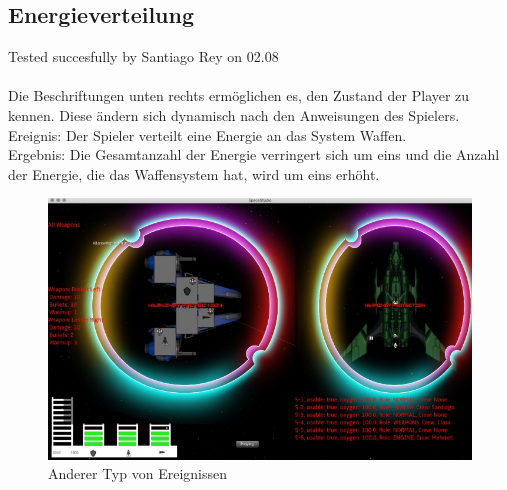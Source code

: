 \documentclass[12pt]{article}
\begin{document}
\subsection{Energieverteilung}
Tested succesfully by Santiago Rey on 02.08\\\\
Die Beschriftungen unten rechts ermöglichen es, den Zustand der Player zu kennen. Diese ändern sich dynamisch nach den Anweisungen des Spielers.\\
Ereignis: Der Spieler verteilt eine Energie an das System Waffen.\\
Ergebnis: Die Gesamtanzahl der Energie verringert sich um eins und die Anzahl der Energie, die das Waffensystem hat, wird um eins erhöht.\\
\begin{figure}[htp]
\centering
\includegraphics[scale=0.7]{TestProtocolBilder/OptimizedEnergieAlleSysteme.png}
\caption{Anderer Typ von Ereignissen}
\end{figure}

\newpage
\end{document}
